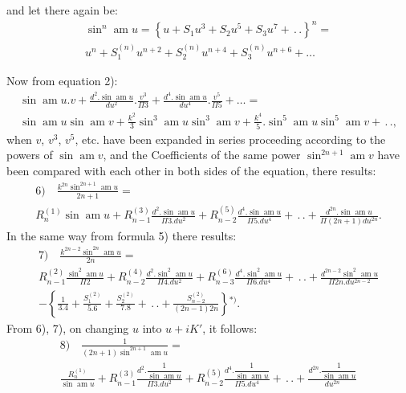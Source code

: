 \documentclass{article}
\begin{document}
and let there again be:
\[
\begin{gathered}
\sin^{n}\operatorname{am}u=\left\{u+S_{1}u^{3}+S_{2}u^{5}+S_{3}u^{7}+\,.\,.\right\}^{n}=\\[1.5ex]
u^{n}+S_{1}^{(n)}u^{n+2}+S_{2}^{(n)}u^{n+4}+S_{3}^{(n)}u^{n+6}+\ldots
\end{gathered}
\]

Now from equation 2):
\[
\begin{gathered}
\sin\operatorname{am}u.v+\frac{d^{2}.\sin\operatorname{am}u}{du^{2}}.\frac{v^{3}}{\Pi 3}+\frac{d^{4}.\sin\operatorname{am}u}{du^{4}}.\frac{v^{5}}{\Pi 5}+\ldots=\\[1.5ex]
\sin\operatorname{am}u\sin\operatorname{am}v+\frac{k^{2}}{3}\sin^{3}\operatorname{am}u\sin^{3}\operatorname{am}v+\frac{k^{4}}{5}.\sin^{5}\operatorname{am}u\sin^{5}\operatorname{am}v+\,.\,.,
\end{gathered}
\]
when $v$, $v^{3}$, $v^{5}$, etc. have been expanded in series proceeding according to the powers of $\sin\operatorname{am}v$, and the Coefficients of the same power $\sin^{2n+1}\operatorname{am}v$ have been compared with each other in both sides of the equation, there results:
\[
\begin{gathered}
\text{6)}\quad\frac{k^{2n}\sin^{2n+1}\operatorname{am}u}{2n+1}=\\[1.5ex]
R_{n}^{(1)}\sin\operatorname{am}u+R_{n-1}^{(3)}\frac{d^{2}.\sin\operatorname{am}u}{\Pi 3.du^{2}}+R_{n-2}^{(5)}\frac{d^{4}.\sin\operatorname{am}u}{\Pi 5.du^{4}}+\,.\,.+\frac{d^{2n}.\sin\operatorname{am}u}{\Pi(2n+1)du^{2n}}.
\end{gathered}
\]
In the same way from formula 5) there results:
\[
\begin{gathered}
\text{7)}\quad\frac{k^{2n-2}\sin^{2n}\operatorname{am}u}{2n}=\\[1.5ex]
R_{n-1}^{(2)}\frac{\sin^{2}\operatorname{am}u}{\Pi 2}+R_{n-2}^{(4)}\frac{d^{2}.\sin^{2}\operatorname{am}u}{\Pi 4.du^{2}}+R_{n-3}^{(6)}\frac{d^{4}.\sin^{2}\operatorname{am}u}{\Pi 6.du^{4}}+\,.\,.+\frac{d^{2n-2}\sin^{2}\operatorname{am}u}{\Pi 2n.du^{2n-2}}\\[1.5ex]
-\left\{\frac{1}{3.4}+\frac{S_{1}^{(2)}}{5.6}+\frac{S_{2}^{(2)}}{7.8}+\,.\,.+\frac{S_{n-2}^{(2)}}{(2n-1)2n}\right\}{}^{*)}.
\end{gathered}
\]
From 6), 7), on changing $u$ into $u+iK'$, it follows:
\[
\begin{gathered}
\text{8)}\quad\frac{1}{(2n+1)\sin^{2n+1}\operatorname{am}u}=\\[1.5ex]
\frac{R_{n}^{(1)}}{\sin\operatorname{am}u}+R_{n-1}^{(3)}\frac{d^{2}.\dfrac{1}{\sin\operatorname{am}u}}{\Pi 3.du^{2}}+R_{n-2}^{(5)}\frac{d^{4}.\dfrac{1}{\sin\operatorname{am}u}}{\Pi 5.du^{4}}+\,.\,.+\frac{d^{2n}.\dfrac{1}{\sin\operatorname{am}u}}{du^{2n}}
\end{gathered}
\]
\end{document}

